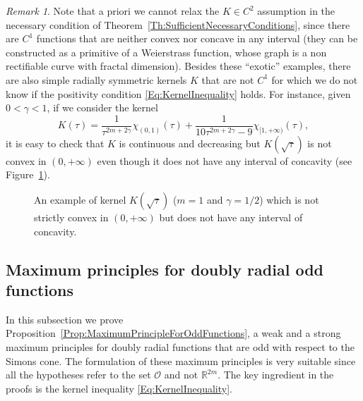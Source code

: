 \documentclass[12pt,reqno]{amsart}
\theoremstyle{definition}
\theoremstyle{remark}
\newtheorem{remark}[theorem]{Remark}
\newcommand{\con}[1]{\mathbb{#1}}
\newcommand{\R}{\con{R}} %
\newcommand{\ocal}{\mathcal{O}}
\newcommand{\s}{\gamma}
\numberwithin{equation}{section}
\begin{document}
\begin{remark}
	Note that a priori we cannot relax the $K\in C^2$ assumption in the necessary condition of Theorem~\ref{Th:SufficientNecessaryConditions}, since there are $C^1$ functions that are neither convex nor concave in any interval (they can be constructed as a primitive of a Weierstrass function, whose graph is a non rectifiable curve with fractal dimension). Besides these ``exotic'' examples, there are also simple radially symmetric kernels $K$ that are not $C^1$ for which we do not know if the positivity condition \eqref{Eq:KernelInequality} holds. For instance, given $0<\s<1$, if we consider the kernel
	$$ K(\tau) = \frac{1}{\tau^{2m+2\s}} \chi_{(0,1)}(\tau)+\frac{1}{10\tau^{2m+2\s}-9} \chi_{[1,+\infty)}(\tau), $$
	it is easy to check that $K$ is continuous and decreasing but $K(\sqrt{\tau})$ is not convex in $(0,+\infty)$ even though it does not have any interval of concavity (see Figure~\ref{Fig:Grafica}).
	\begin{figure}
		\centering
		\caption{An example of kernel $K(\sqrt{\tau})$ ($m=1$ and $\s=1/2$) which is not strictly convex in $(0,+\infty)$ but does not have any interval of concavity. }
		\label{Fig:Grafica}
	\end{figure}
\end{remark}



\subsection{Maximum principles for doubly radial odd functions}

In this subsection we prove Proposition~\ref{Prop:MaximumPrincipleForOddFunctions}, a weak and a strong maximum principles for doubly radial functions that are odd with respect to the Simons cone. The formulation of these maximum principles is very suitable since all the hypotheses refer to the set $\ocal$ and not $\R^{2m}$. The key ingredient in the proofs is the kernel inequality \eqref{Eq:KernelInequality}.
\end{document}
